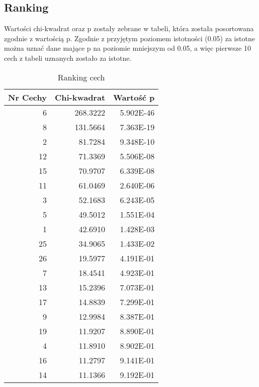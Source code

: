 \documentclass[runningheads]{llncs}
\begin{document}
\subsection{Ranking}
Wartości chi-kwadrat oraz p zostały zebrane w tabeli, która została posortowana zgodnie z wartością p. Zgodnie z przyjętym poziomem istotności (0.05) za istotne można uznać dane mające p na poziomie mniejszym od 0.05, a więc pierwsze 10 cech z tabeli uznanych zostało za istotne.
\begin{table}[htbp]
  \centering
  \caption{Ranking cech}
    \begin{tabular}{|r|r|r|}
    \hline
    \multicolumn{1}{|c|}{\textbf{Nr Cechy}} & \multicolumn{1}{c|}{\textbf{Chi-kwadrat}} & \multicolumn{1}{c|}{\textbf{Wartość p}} \bigstrut\\
    \hline
    6 & 268.3222 & 5.902E-46 \bigstrut\\
    \hline
    8 & 131.5664 & 7.363E-19 \bigstrut\\
    \hline
    2 & 81.7284 & 9.348E-10 \bigstrut\\
    \hline
    12 & 71.3369 & 5.506E-08 \bigstrut\\
    \hline
    15 & 70.9707 & 6.339E-08 \bigstrut\\
    \hline
    11 & 61.0469 & 2.640E-06 \bigstrut\\
    \hline
    3 & 52.1683 & 6.243E-05 \bigstrut\\
    \hline
    5 & 49.5012 & 1.551E-04 \bigstrut\\
    \hline
    1 & 42.6910 & 1.428E-03 \bigstrut\\
    \hline
    25 & 34.9065 & 1.433E-02 \bigstrut\\
    \hline
    26 & 19.5977 & 4.191E-01 \bigstrut\\
    \hline
    7 & 18.4541 & 4.923E-01 \bigstrut\\
    \hline
    13 & 15.2396 & 7.073E-01 \bigstrut\\
    \hline
    17 & 14.8839 & 7.299E-01 \bigstrut\\
    \hline
    9 & 12.9984 & 8.387E-01 \bigstrut\\
    \hline
    19 & 11.9207 & 8.890E-01 \bigstrut\\
    \hline
    4 & 11.8910 & 8.902E-01 \bigstrut\\
    \hline
    16 & 11.2797 & 9.141E-01 \bigstrut\\
    \hline
    14 & 11.1366 & 9.192E-01 \bigstrut\\

\end{tabular}
\end{table}
\end{document}

